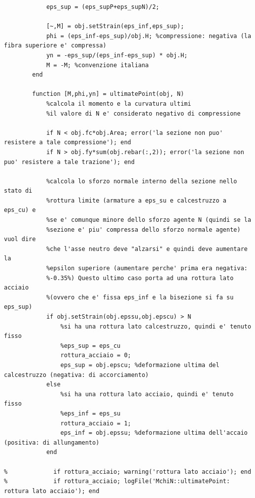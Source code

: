 \documentclass[10pt]{article}
\begin{document}
\begin{lstlisting}
            eps_sup = (eps_supP+eps_supN)/2;
            
            [~,M] = obj.setStrain(eps_inf,eps_sup);
            phi = (eps_inf-eps_sup)/obj.H; %compressione: negativa (la fibra superiore e' compressa)
            yn = -eps_sup/(eps_inf-eps_sup) * obj.H;
            M = -M; %convenzione italiana
        end
        
        function [M,phi,yn] = ultimatePoint(obj, N)
            %calcola il momento e la curvatura ultimi
            %il valore di N e' considerato negativo di compressione
            
            if N < obj.fc*obj.Area; error('la sezione non puo' resistere a tale compressione'); end
            if N > obj.fy*sum(obj.rebar(:,2)); error('la sezione non puo' resistere a tale trazione'); end
            
            %calcola lo sforzo normale interno della sezione nello stato di
            %rottura limite (armature a eps_su e calcestruzzo a eps_cu) e
            %se e' comunque minore dello sforzo agente N (quindi se la
            %sezione e' piu' compressa dello sforzo normale agente) vuol dire
            %che l'asse neutro deve "alzarsi" e quindi deve aumentare la
            %epsilon superiore (aumentare perche' prima era negativa:
            %-0.35%) Questo ultimo caso porta ad una rottura lato acciaio
            %(ovvero che e' fissa eps_inf e la bisezione si fa su eps_sup)
            if obj.setStrain(obj.epssu,obj.epscu) > N
                %si ha una rottura lato calcestruzzo, quindi e' tenuto fisso
                %eps_sup = eps_cu
                rottura_acciaio = 0;
                eps_sup = obj.epscu; %deformazione ultima del calcestruzzo (negativa: di accorciamento)
            else
                %si ha una rottura lato acciaio, quindi e' tenuto fisso
                %eps_inf = eps_su
                rottura_acciaio = 1;
                eps_inf = obj.epssu; %deformazione ultima dell'accaio (positiva: di allungamento)
            end
            
%             if rottura_acciaio; warning('rottura lato acciaio'); end
%             if rottura_acciaio; logFile('MchiN::ultimatePoint: rottura lato acciaio'); end
            

\end{lstlisting}
\end{document}

